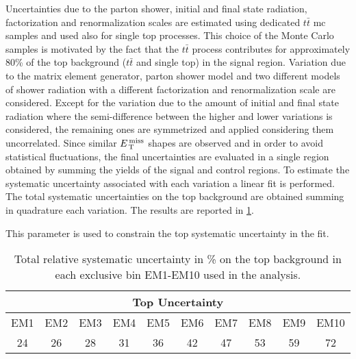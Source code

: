 Uncertainties due to the parton shower, initial and final state radiation,
factorization and renormalization scales are estimated using dedicated
$t \bar{t}$ \gls{mc} samples and used also for single top processes. This choice
of the Monte Carlo samples is motivated by the fact that the $t \bar{t}$ process
contributes for approximately 80\% of the top background ($t \bar{t}$ and single
top) in the signal region. Variation due to the matrix element generator, parton
shower model and two different models of shower radiation with a different
factorization and renormalization scale are considered. Except for the variation
due to the amount of initial and final state radiation where the semi-difference
between the higher and lower variations is considered, the remaining ones are
symmetrized and applied considering them uncorrelated. Since similar $E_\mathrm{\, T}^\mathrm{\, miss}$
shapes are observed and in order to avoid statistical fluctuations, the final
uncertainties are evaluated in a single region obtained by summing the yields of
the signal and control regions. To estimate the systematic uncertainty
associated with each variation a linear fit is performed. The total systematic
uncertainties on the top background are obtained summing in quadrature each
variation. The results are reported in \cref{tab:top_syst_2016}.
\begin{description}[font=\normalfont]
\item[top\_Sys:] This parameter is used to constrain the top systematic
  uncertainty in the fit.
\end{description}
\begin{table}[!ht]
  \centering
  \begin{tabular}{cccccccccc}
    \toprule
    \multicolumn{10}{c}{Top Uncertainty} \\
    \midrule \midrule
    EM1 & EM2 & EM3 & EM4 & EM5 & EM6 & EM7 & EM8 & EM9 & EM10 \\
    \midrule
    24 & 26 & 28 & 31 & 36 & 42 & 47 & 53 & 59 & 72 \\
    \bottomrule
  \end{tabular}
  \caption{Total relative systematic uncertainty in \% on the top background in
    each exclusive bin EM1-EM10 used in the analysis.}
  \label{tab:top_syst_2016}
\end{table}

